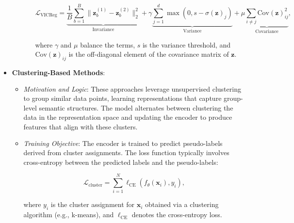 \begin{itemize}
\begin{itemize}
\begin{itemize}
            \[
            \mathcal{L}_{\text{VICReg}} = \underbrace{\frac{1}{B} \sum_{b=1}^B \| \mathbf{z}_b^{(1)} - \mathbf{z}_b^{(2)} \|_2^2}_{\text{Invariance}} + \gamma \underbrace{\sum_{j=1}^d \max(0, s - \sigma(\mathbf{z})_j)}_{\text{Variance}} + \mu \underbrace{\sum_{i \neq j} \text{Cov}(\mathbf{z})_{ij}^2}_{\text{Covariance}},
            \]
        
            where \( \gamma \) and \( \mu \) balance the terms, \( s \) is the variance threshold, and \( \text{Cov}(\mathbf{z})_{ij} \) is the off-diagonal element of the covariance matrix of \( \mathbf{z} \).
        \end{itemize}        
    \end{itemize}

    \item \textbf{Clustering-Based Methods}:
    \begin{itemize}
        \item \emph{Motivation and Logic}: These approaches leverage unsupervised clustering to group similar data points, learning representations that capture group-level semantic structures. The model alternates between clustering the data in the representation space and updating the encoder to produce features that align with these clusters.
        \item \emph{Training Objective}: The encoder is trained to predict pseudo-labels derived from cluster assignments. The loss function typically involves cross-entropy between the predicted labels and the pseudo-labels:

        \[
        \mathcal{L}_{\text{cluster}} = \sum_{i=1}^N \ell_{\text{CE}}(f_{\theta}(\mathbf{x}_i), y_i),
        \]

        where \( y_i \) is the cluster assignment for \( \mathbf{x}_i \) obtained via a clustering algorithm (e.g., k-means), and \( \ell_{\text{CE}} \) denotes the cross-entropy loss.


\end{itemize}
\end{itemize}
